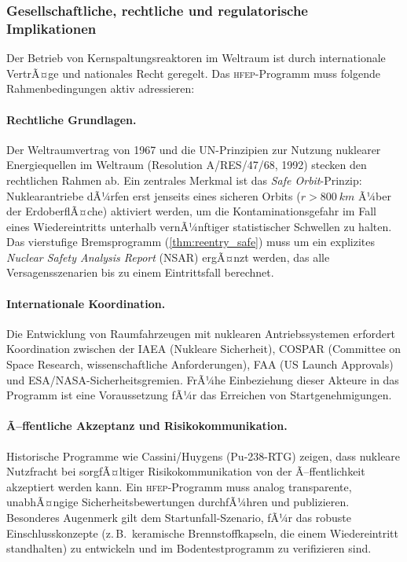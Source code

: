 ﻿\documentclass[a4paper,12pt,twoside]{article}
\theoremstyle{plain}
\theoremstyle{definition}
\theoremstyle{remark}
\newcommand{\HFEP}{\textsc{hfep}}
\begin{document}
	\subsubsection{Gesellschaftliche, rechtliche und regulatorische Implikationen}

	Der Betrieb von Kernspaltungsreaktoren im Weltraum ist durch internationale
	VertrÃ¤ge und nationales Recht geregelt. Das \HFEP-Programm muss folgende
	Rahmenbedingungen aktiv adressieren:

	\paragraph{Rechtliche Grundlagen.}
	Der Weltraumvertrag von 1967 und die UN-Prinzipien zur Nutzung nuklearer
	Energiequellen im Weltraum (Resolution A/RES/47/68, 1992) stecken den
	rechtlichen Rahmen ab. Ein zentrales Merkmal ist das
	\emph{Safe Orbit}-Prinzip: Nuklearantriebe dÃ¼rfen erst jenseits eines
	sicheren Orbits ($r > \SI{800}{km}$ Ã¼ber der ErdoberflÃ¤che) aktiviert
	werden, um die Kontaminationsgefahr im Fall eines Wiedereintritts
	unterhalb vernÃ¼nftiger statistischer Schwellen zu halten. Das vierstufige
	Bremsprogramm (\cref{thm:reentry_safe}) muss um ein explizites
	\emph{Nuclear Safety Analysis Report} (NSAR) ergÃ¤nzt werden, das alle
	Versagensszenarien bis zu einem Eintrittsfall berechnet.

	\paragraph{Internationale Koordination.}
	Die Entwicklung von Raumfahrzeugen mit nuklearen Antriebssystemen erfordert
	Koordination zwischen der IAEA (Nukleare Sicherheit), COSPAR (Committee
	on Space Research, wissenschaftliche Anforderungen), FAA (US Launch
	Approvals) und ESA/NASA-Sicherheitsgremien. FrÃ¼he Einbeziehung dieser
	Akteure in das Programm ist eine Voraussetzung fÃ¼r das Erreichen von
	Startgenehmigungen.

	\paragraph{Ã–ffentliche Akzeptanz und Risikokommunikation.}
	Historische Programme wie Cassini/Huygens (Pu-238-RTG) zeigen, dass
	nukleare Nutzfracht bei sorgfÃ¤ltiger Risikokommunikation von der
	Ã–ffentlichkeit akzeptiert werden kann. Ein \HFEP-Programm muss analog
	transparente, unabhÃ¤ngige Sicherheitsbewertungen durchfÃ¼hren und publizieren.
	Besonderes Augenmerk gilt dem Startunfall-Szenario, fÃ¼r das robuste
	Einschlusskonzepte (z.\,B.\ keramische Brennstoffkapseln, die einem
	Wiedereintritt standhalten) zu entwickeln und im Bodentestprogramm
	zu verifizieren sind.
\end{document}
